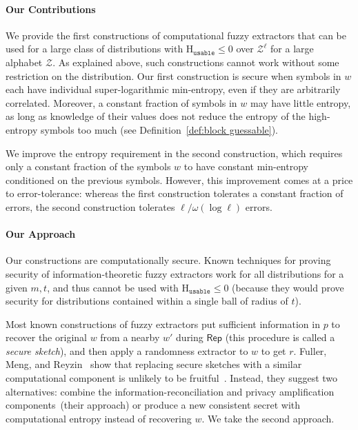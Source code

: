 \documentclass[11pt]{article}
\newcommand{\defref}[1]{\mbox{Definition~\ref{#1}}}
\newcommand{\class}[1]{{\ensuremath{\mathsf{#1}}}}
\newcommand{\rep}{\ensuremath{\class{Rep}}\xspace}
\newcommand{\Huse}{\mathrm{H}_{\mathtt{usable}}}
\begin{document}
\paragraph{Our Contributions}
We provide the first constructions of computational fuzzy extractors that can be used for a large class of distributions with $\Huse\le 0$ over $\mathcal{Z}^\ell$ for a large alphabet $\mathcal{Z}$.  As explained above, such constructions cannot work without some restriction on the distribution.
Our first construction is secure when symbols in $w$
each have individual super-logarithmic min-entropy, even if they are arbitrarily correlated. Moreover,
a constant fraction of symbols in $w$ may have little entropy, as long as knowledge of their values does not reduce the entropy of the high-entropy symbols too much (see \defref{def:block guessable}).

We improve the entropy requirement in the second construction, which requires only a constant fraction of the symbols $w$ to have constant min-entropy conditioned on the previous symbols.
However, this improvement comes at a price to error-tolerance: whereas the first construction tolerates a constant fraction of errors, the second construction tolerates $\ell/\omega(\log\ell)$ errors.



\paragraph{Our Approach}
Our constructions are computationally secure.  Known techniques for proving security of information-theoretic  fuzzy extractors work for all distributions for a given $m, t$, and thus cannot be used with $\Huse\le 0$ (because they would prove security for distributions contained within a single ball of radius of $t$). 

Most known constructions of fuzzy extractors put sufficient information in $p$ to recover the original $w$ from a nearby $w'$ during $\rep$ (this procedure is called a \emph{secure sketch}), and then apply a randomness extractor to $w$ to get $r$.
Fuller, Meng, and Reyzin~\cite{fuller2013computational} show that replacing secure sketches with a similar computational component is unlikely to be fruitful~\cite[Corollary 3.8, Theorem 3.10]{fuller2013computational}.  Instead, they suggest two alternatives: combine the information-reconciliation and privacy amplification components~(their approach) or produce a new consistent secret with computational entropy instead of recovering $w$.  We take the second approach.
\end{document}
